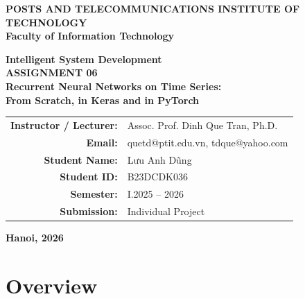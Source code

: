 \documentclass[11pt, a4paper]{article}
\begin{document}
\begin{titlepage}
\begin{center}
\vspace*{0.5cm}
\Large
\textbf{POSTS AND TELECOMMUNICATIONS INSTITUTE OF TECHNOLOGY}\\
\textbf{Faculty of Information Technology}

\vspace{2.0cm}
\Huge
\textbf{Intelligent System Development}\\
\vspace{0.4cm}
\LARGE
\textbf{ASSIGNMENT 06}\\
\vspace{0.6cm}
\Large
\textbf{Recurrent Neural Networks on Time Series:\\From Scratch, in Keras and in PyTorch}

\vfill
\normalsize
\begin{tabular}{rl}
\textbf{Instructor / Lecturer:} & Assoc. Prof. Dinh Que Tran, Ph.D. \\
\textbf{Email:} & quetd@ptit.edu.vn, tdque@yahoo.com \\[0.8cm]
\textbf{Student Name:} & Lưu Anh Dũng \\
\textbf{Student ID:} & B23DCDK036 \\
\textbf{Semester:} & I.2025 -- 2026 \\
\textbf{Submission:} & Individual Project \\
\end{tabular}

\vfill
\textbf{Hanoi, 2026}
\vspace{0.5cm}
\end{center}
\end{titlepage}

\tableofcontents
\newpage

\section{Overview}
\end{document}

